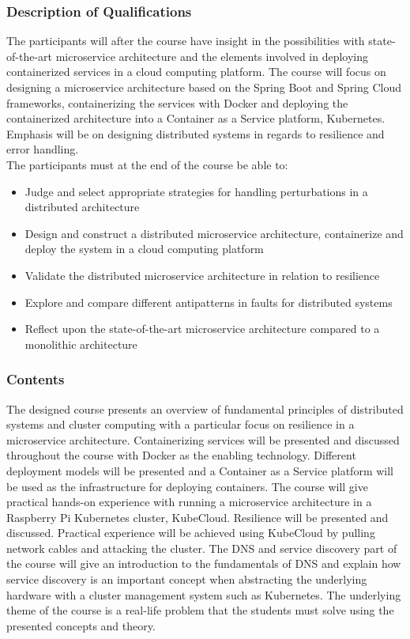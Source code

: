 \subsubsection*{Description of Qualifications}
The participants will after the course have insight in the possibilities with state-of-the-art microservice architecture and the elements involved in deploying containerized services in a cloud computing platform. The course will focus on designing a microservice architecture based on the Spring Boot and Spring Cloud frameworks, containerizing the services with Docker and deploying the containerized architecture into a Container as a Service platform, Kubernetes. Emphasis will be on designing distributed systems in regards to resilience and error handling. \\

\noindent 
The participants must at the end of the course be able to: 
\begin{itemize}
  \item Judge and select appropriate strategies for handling perturbations in a distributed architecture
  \item Design and construct a distributed microservice architecture, containerize and deploy the system in a cloud computing platform
  \item Validate the distributed microservice architecture in relation to resilience
  \item Explore and compare different antipatterns in faults for distributed systems
  \item Reflect upon the state-of-the-art microservice architecture compared to a monolithic architecture
\end{itemize}

\subsubsection*{Contents}
The designed course presents an overview of fundamental principles of distributed systems and cluster computing with a particular focus on resilience in a microservice architecture. Containerizing services will be presented and discussed throughout the course with Docker as the enabling technology. Different deployment models will be presented and a Container as a Service platform will be used as the infrastructure for deploying containers. The course will give practical hands-on experience with running a microservice architecture in a Raspberry Pi Kubernetes cluster, KubeCloud. Resilience will be presented and discussed. Practical experience will be achieved using KubeCloud by pulling network cables and attacking the cluster. The DNS and service discovery part of the course will give an introduction to the fundamentals of DNS and explain how service discovery is an important concept when abstracting the underlying hardware with a cluster management system such as Kubernetes. The underlying theme of the course is a real-life problem that the students must solve using the presented concepts and theory.

